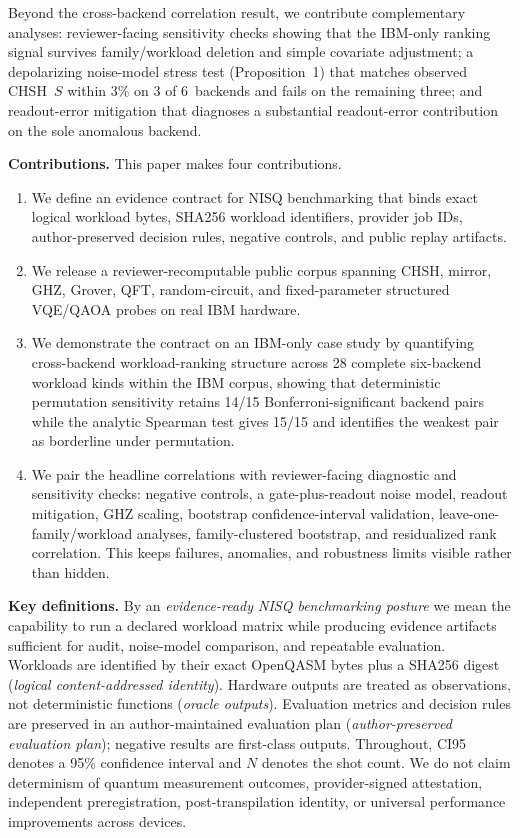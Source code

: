 \documentclass[aps,prxquantum,twocolumn,superscriptaddress,amsmath,amssymb,longbibliography,floatfix]{revtex4-2}
\begin{document}
Beyond the cross-backend correlation result, we contribute complementary analyses: reviewer-facing sensitivity checks showing that the IBM-only ranking signal survives family/workload deletion and simple covariate adjustment; a depolarizing noise-model stress test (Proposition~1) that matches observed CHSH~$S$ within 3\% on 3 of 6~backends and fails on the remaining three; and readout-error mitigation that diagnoses a substantial readout-error contribution on the sole anomalous backend.

\textbf{Contributions.} This paper makes four contributions.
\begin{enumerate}
  \item We define an evidence contract for NISQ benchmarking that binds exact logical workload bytes, SHA256 workload identifiers, provider job IDs, author-preserved decision rules, negative controls, and public replay artifacts.
  \item We release a reviewer-recomputable public corpus spanning CHSH, mirror, GHZ, Grover, QFT, random-circuit, and fixed-parameter structured VQE/QAOA probes on real IBM hardware.
  \item We demonstrate the contract on an IBM-only case study by quantifying cross-backend workload-ranking structure across 28 complete six-backend workload kinds within the IBM corpus, showing that deterministic permutation sensitivity retains 14/15 Bonferroni-significant backend pairs while the analytic Spearman test gives 15/15 and identifies the weakest pair as borderline under permutation.
  \item We pair the headline correlations with reviewer-facing diagnostic and sensitivity checks: negative controls, a gate-plus-readout noise model, readout mitigation, GHZ scaling, bootstrap confidence-interval validation, leave-one-family/workload analyses, family-clustered bootstrap, and residualized rank correlation. This keeps failures, anomalies, and robustness limits visible rather than hidden.
\end{enumerate}

\textbf{Key definitions.} By an \emph{evidence-ready NISQ benchmarking posture} we mean the capability to run a declared workload matrix while producing evidence artifacts sufficient for audit, noise-model comparison, and repeatable evaluation. Workloads are identified by their exact OpenQASM bytes plus a SHA256 digest (\emph{logical content-addressed identity}). Hardware outputs are treated as observations, not deterministic functions (\emph{oracle outputs}). Evaluation metrics and decision rules are preserved in an author-maintained evaluation plan (\emph{author-preserved evaluation plan}); negative results are first-class outputs. Throughout, CI95 denotes a 95\% confidence interval and $N$ denotes the shot count. We do not claim determinism of quantum measurement outcomes, provider-signed attestation, independent preregistration, post-transpilation identity, or universal performance improvements across devices.
\end{document}
